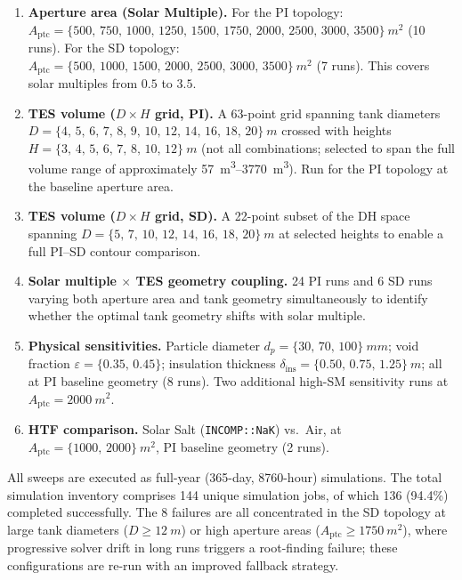 \documentclass[11pt,review,3p]{elsarticle}
\begin{document}
\begin{enumerate}[leftmargin=*, itemsep=3pt]
    \item \textbf{Aperture area (Solar Multiple).} For the PI topology: $A_{\text{ptc}} = \{500,\,750,\,1000,\,1250,\,1500,\,1750,\,2000,\,2500,\,3000,\,3500\}\ \si{m^2}$ (10 runs). For the SD topology: $A_{\text{ptc}} = \{500,\,1000,\,1500,\,2000,\,2500,\,3000,\,3500\}\ \si{m^2}$ (7 runs). This covers solar multiples from $0.5$ to $3.5$.

    \item \textbf{TES volume ($D \times H$ grid, PI).} A 63-point grid spanning tank diameters $D = \{4,\,5,\,6,\,7,\,8,\,9,\,10,\,12,\,14,\,16,\,18,\,20\}\ \si{m}$ crossed with heights $H = \{3,\,4,\,5,\,6,\,7,\,8,\,10,\,12\}\ \si{m}$ (not all combinations; selected to span the full volume range of approximately \SIrange{57}{3770}{m^3}). Run for the PI topology at the baseline aperture area.

    \item \textbf{TES volume ($D \times H$ grid, SD).} A 22-point subset of the D\texttimes H space spanning $D = \{5,\,7,\,10,\,12,\,14,\,16,\,18,\,20\}\ \si{m}$ at selected heights to enable a full PI--SD contour comparison.

    \item \textbf{Solar multiple $\times$ TES geometry coupling.} 24 PI runs and 6 SD runs varying both aperture area and tank geometry simultaneously to identify whether the optimal tank geometry shifts with solar multiple.

    \item \textbf{Physical sensitivities.} Particle diameter $d_p = \{30,\,70,\,100\}\ \si{mm}$; void fraction $\varepsilon = \{0.35,\,0.45\}$; insulation thickness $\delta_{\text{ins}} = \{0.50,\,0.75,\,1.25\}\ \si{m}$; all at PI baseline geometry (8 runs). Two additional high-SM sensitivity runs at $A_{\text{ptc}} = \SI{2000}{m^2}$.

    \item \textbf{HTF comparison.} Solar Salt (\texttt{INCOMP::NaK}) vs.~Air, at $A_{\text{ptc}} = \{1000,\,2000\}\ \si{m^2}$, PI baseline geometry (2 runs).
\end{enumerate}

All sweeps are executed as full-year (365-day, 8760-hour) simulations. The total simulation inventory comprises 144 unique simulation jobs, of which 136 (94.4\%) completed successfully. The 8 failures are all concentrated in the SD topology at large tank diameters ($D \ge \SI{12}{m}$) or high aperture areas ($A_{\text{ptc}} \ge \SI{1750}{m^2}$), where progressive solver drift in long runs triggers a root-finding failure; these configurations are re-run with an improved fallback strategy.
\end{document}

